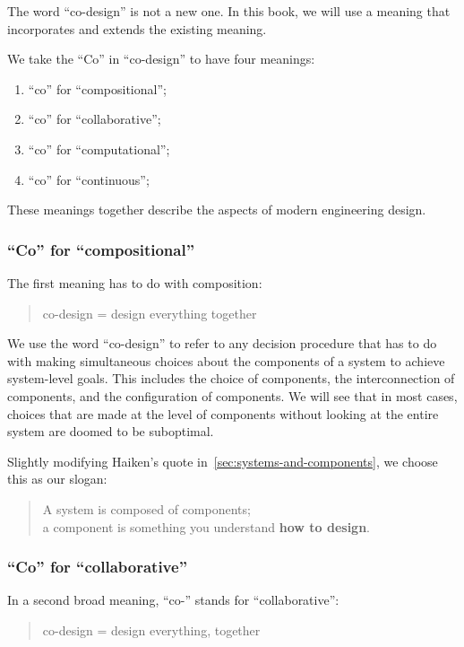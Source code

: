 The word ``co-design'' is not a new one. In this book, we will use 
a meaning that incorporates and extends the existing meaning.

We take the ``Co'' in ``co-design'' to have four meanings:
\begin{enumerate}
    \item ``co'' for ``compositional'';
    \item ``co'' for ``collaborative'';
    \item  ``co'' for ``computational'';
    \item   ``co'' for ``continuous'';
\end{enumerate}
These meanings together describe the aspects of modern engineering design.


\subsubsection{``Co'' for ``compositional''}

The first meaning has to do with composition:

\begin{quote}
     co-design = design everything together
\end{quote}

We use the word ``co-design'' to refer to any decision procedure that has to do with making
simultaneous choices about the components of a system  to achieve system-level
goals. This includes the choice of components, the interconnection of components, and the configuration of components. We will see that in most cases, choices that are made at the level of components without looking at the entire system are doomed to be suboptimal.


Slightly modifying Haiken's quote in~\cref{sec:systems-and-components}, we choose this as our slogan:

\begin{quote}
     A system is composed of components;\\
       a component is something you understand
       \textbf{how to design}.
\end{quote}

\subsubsection{``Co'' for ``collaborative''}

In a second broad meaning, ``co-'' stands for ``collaborative'':

\begin{quote}
    co-design = design everything, together
\end{quote}


